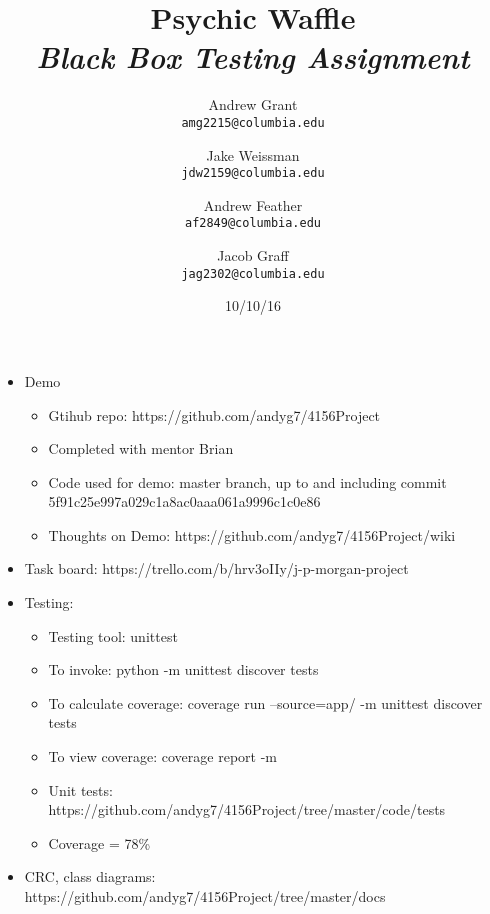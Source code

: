 \documentclass{article}
\title{Psychic Waffle \\
	\textit{Black Box Testing Assignment}}
\author{
    Andrew Grant\\
    \texttt{amg2215@columbia.edu}
    \and
    Jake Weissman\\
    \texttt{jdw2159@columbia.edu}
        \and
    Andrew Feather\\
    \texttt{af2849@columbia.edu}
        \and
    Jacob Graff\\
    \texttt{jag2302@columbia.edu}
}
\date{10/10/16}
\begin{document}
\maketitle

\section{}
\begin{itemize}
\item Demo
\begin{itemize}
\item Gtihub repo: https://github.com/andyg7/4156Project
\item Completed with mentor Brian
\item Code used for demo: master branch, up to and including commit 5f91c25e997a029c1a8ac0aaa061a9996c1c0e86
\item Thoughts on Demo: https://github.com/andyg7/4156Project/wiki
\end{itemize}

\item Task board: https://trello.com/b/hrv3oIIy/j-p-morgan-project
\item Testing:
\begin{itemize}
\item Testing tool: unittest
\item To invoke: python -m unittest discover tests
\item To calculate coverage: coverage run --source=app/  -m unittest discover tests
\item To view coverage: coverage report -m
\item Unit tests: https://github.com/andyg7/4156Project/tree/master/code/tests
\item Coverage = 78\%
\end{itemize}
\item CRC, class diagrams: https://github.com/andyg7/4156Project/tree/master/docs
\end{itemize}
\end{document}
